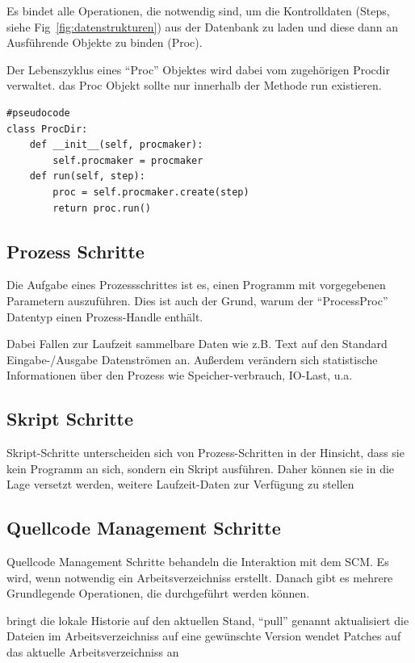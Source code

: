 Es bindet alle Operationen, die notwendig sind,
um die Kontrolldaten (Steps, siehe Fig~\ref{fig:datenstrukturen})
aus der Datenbank zu laden und diese dann an Ausführende Objekte zu binden (Proc).

Der Lebenszyklus eines ``Proc'' Objektes wird dabei vom zugehörigen Procdir verwaltet.
das Proc Objekt sollte nur innerhalb der Methode run existieren.
\lstset{language=python}
\begin{lstlisting}
#pseudocode
class ProcDir:
    def __init__(self, procmaker):
        self.procmaker = procmaker
    def run(self, step):
        proc = self.procmaker.create(step)
        return proc.run()
\end{lstlisting}


\subsection{Prozess Schritte}

Die Aufgabe eines Prozessschrittes ist es,
einen Programm mit vorgegebenen Parametern auszuführen.
Dies ist auch der Grund, warum der ``ProcessProc'' Datentyp einen
Prozess-Handle enthält.

Dabei Fallen zur Laufzeit sammelbare Daten wie z.B. Text auf den Standard Eingabe-/Ausgabe Datenströmen an.
Außerdem verändern sich statistische Informationen über den Prozess wie Speicher-verbrauch, IO-Last, u.a.


\subsection{Skript Schritte}

Skript-Schritte unterscheiden sich von Prozess-Schritten in der Hinsicht,
dass sie kein Programm an sich, sondern ein Skript ausführen.
Daher können sie in die Lage versetzt werden,
weitere Laufzeit-Daten zur Verfügung zu stellen


\subsection{Quellcode Management Schritte}

Quellcode Management Schritte behandeln die Interaktion mit dem SCM.
Es wird, wenn notwendig ein Arbeitsverzeichniss erstellt.
Danach gibt es mehrere Grundlegende Operationen, die durchgeführt werden können.

\begin{description}
        bringt die lokale Historie auf den aktuellen Stand, ``pull'' genannt
        aktualisiert die Dateien im Arbeitsverzeichniss
        auf eine gewünschte Version
        wendet Patches auf das aktuelle Arbeitsverzeichniss an
\end{description}


